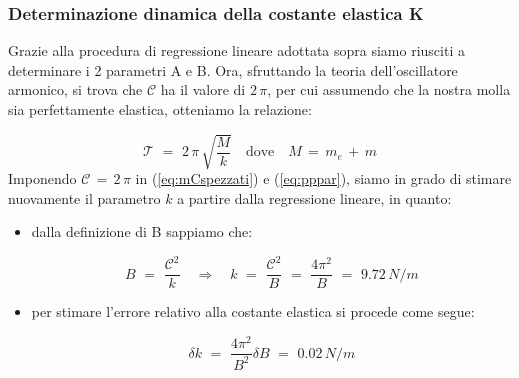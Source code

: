 %
%
%
%

\subsubsection{Determinazione dinamica della costante elastica K}

Grazie alla procedura di regressione lineare adottata sopra siamo riusciti a determinare i 2 parametri A e B. Ora, sfruttando la teoria dell'oscillatore armonico, si trova che $\mathcal{C}$ ha il valore di $2 \, \pi$, per cui assumendo che la nostra molla sia perfettamente elastica, otteniamo la relazione:

\begin{equation}
	\mathcal{T} \,\,=\,\, 2 \, \pi \, \sqrt{\frac{M}{k}} \quad \text{dove} \quad M \,=\, m_e\,+\,m
\end{equation}
%
Imponendo $\mathcal{C} \,=\, 2\,\pi$ in (\ref{eq:mCspezzati}) e (\ref{eq:pppar}), siamo in grado di stimare nuovamente il parametro $k$ a partire dalla regressione lineare, in quanto:
\begin{itemize}
	\item{dalla definizione di B sappiamo che:
	
			\begin{equation*}
				B \,\,=\,\, \frac{\mathcal{C}^2}{k} \quad \Longrightarrow \quad k \,\,=\,\, \frac{\mathcal{C}^2}{B} \,\,
                =\,\, \frac{4\pi^2}{B} \,\,=\,\, 9.72 \, N/m
			\end{equation*}}
	\item{per stimare l'errore relativo alla costante elastica si procede come segue:
	
			\begin{equation*}
				\delta k \,\,=\,\, \frac{4\pi^2}{B^2}\delta B \,\,=\,\, 0.02 \, N/m
			\end{equation*}
			}
\end{itemize}

